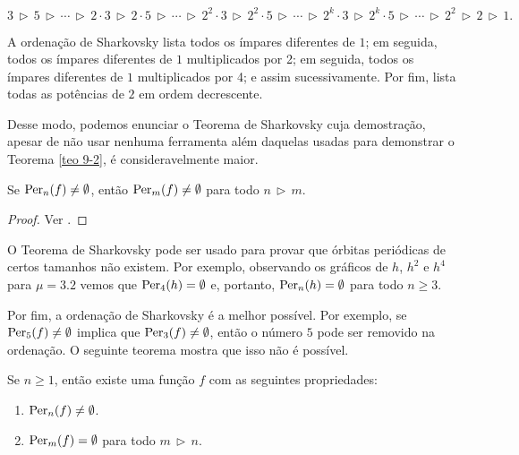 \begin{definition}
$$3 \, \triangleright \, 5 
\, \triangleright \, \cdots \, \triangleright \,
2 \cdot 3 \, \triangleright \, 2 \cdot 5 
\, \triangleright \, \cdots \, \triangleright \,
2^2 \cdot 3 \, \triangleright \, 2^2 \cdot 5
\, \triangleright \, \cdots \, \triangleright \,
2^k \cdot 3 \, \triangleright \, 2^k \cdot 5
\, \triangleright \, \cdots \, \triangleright \,
2^2 \, \triangleright \, 2 \, \triangleright \, 1.$$
\end{definition}

A ordenação de Sharkovsky lista todos os ímpares diferentes de $1$; em seguida, todos os ímpares diferentes de $1$ multiplicados por 2; em seguida, todos os ímpares diferentes de $1$ multiplicados por 4; e assim sucessivamente. Por fim, lista todas as potências de $2$ em ordem decrescente.

Desse modo, podemos enunciar o Teorema de Sharkovsky cuja demostração, apesar de não usar nenhuma ferramenta além daquelas usadas para demonstrar o Teorema \ref{teo 9-2}, é consideravelmente maior.

\begin{theorem}[Sharkovsky]
Se $\operatorname{Per}_n(f) \neq \emptyset$, então $\operatorname{Per}_m(f) \neq \emptyset$ para todo $n \, \triangleright \, m$.
\end{theorem}

\begin{proof}
Ver \cite{burns}.
\end{proof}

O Teorema de Sharkovsky pode ser usado para provar que órbitas periódicas de certos tamanhos não existem. Por exemplo, observando os gráficos de $h$, $h^2$ e $h^4$ para $\mu = 3.2$ vemos que $\operatorname{Per}_4(h) = \emptyset$ e, portanto, $\operatorname{Per}_n(h) = \emptyset$ para todo $n \geq 3$.

Por fim, a ordenação de Sharkovsky é a melhor possível. Por exemplo, se $\operatorname{Per}_5(f) \neq \emptyset$ implica que $\operatorname{Per}_3(f) \neq \emptyset$, então o número $5$ pode ser removido na ordenação. O seguinte teorema mostra que isso não é possível.

\begin{theorem}
Se $n \geq 1$, então existe uma função $f$ com as seguintes propriedades:
\begin{enumerate}
\item $\operatorname{Per}_n(f) \neq \emptyset$.
\item $\operatorname{Per}_m(f) =  \emptyset$ para todo $m \, \triangleright \, n$.
\end{enumerate}
\end{theorem}

